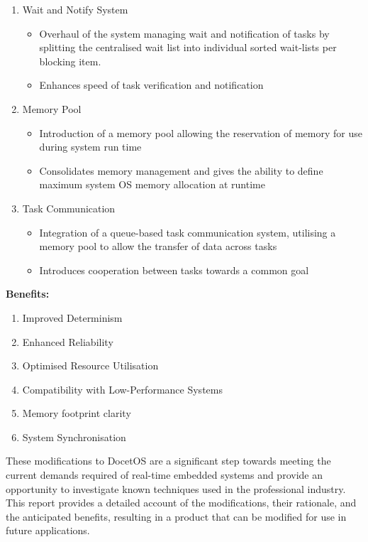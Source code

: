 \begin{enumerate}
	\item Wait and Notify System
	\begin{itemize}
		\item Overhaul of the system managing wait and notification of tasks by splitting the centralised wait list into individual sorted wait-lists per blocking item.
		\item Enhances speed of task verification and notification
	\end{itemize}
	
	\item Memory Pool
	\begin{itemize}
		\item Introduction of a memory pool allowing the reservation of memory for use during system run time
		\item Consolidates memory management and gives the ability to define maximum system OS memory allocation at runtime
	\end{itemize}
	
	\item Task Communication
	\begin{itemize}
		\item Integration of a queue-based task communication system, utilising a memory pool to allow the transfer of data across tasks
		\item Introduces cooperation between tasks towards a common goal
	\end{itemize}
	
\end{enumerate}
\textbf{Benefits:}
\begin{enumerate}
	\item Improved Determinism
	\item Enhanced Reliability
	\item Optimised Resource Utilisation
	\item Compatibility with Low-Performance Systems
	\item Memory footprint clarity
	\item System Synchronisation
\end{enumerate}
These modifications to DocetOS are a significant step towards meeting the current demands required of real-time embedded systems and provide an opportunity to investigate known techniques used in the professional industry. This report provides a detailed account of the modifications, their rationale, and the anticipated benefits, resulting in a product that can be modified for use in future applications. \hfill\break